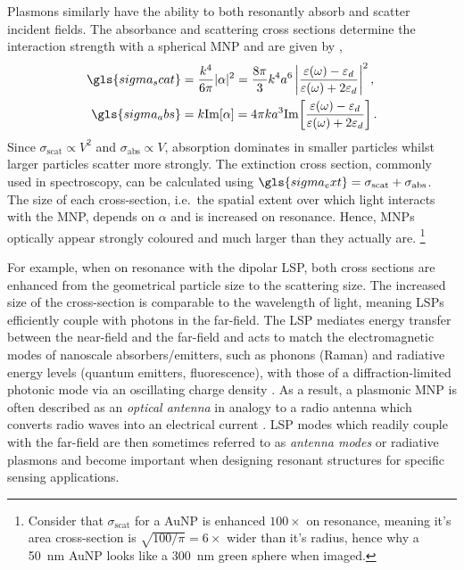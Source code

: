 \documentclass{article}
\begin{document}
Plasmons similarly have the ability to both resonantly absorb and scatter incident fields. The absorbance and scattering cross sections determine the interaction strength with a spherical MNP and are given by \cite{bohren2008absorption},
\begin{subequations}
\begin{align}
	\gls{sigma_scat} &= \frac{\wvm^4}{6\pi} |\alpha|^2 = \frac{8\pi}{3}\wvm^4a^6 \left| \frac{\dielectric - \epsdi}{\dielectric + 2\epsdi} \right|^2, \\
	\gls{sigma_abs} &= \wvm\imag{\alpha} = 4\pi \wvm a^3 \imag{ \frac{\dielectric - \epsdi}{\dielectric + 2\epsdi} }.
\end{align}
\end{subequations}
Since $\sigma_{\mathrm{scat}} \propto V^2$ and $\sigma_{\mathrm{abs}} \propto V$, absorption dominates in smaller particles whilst larger particles scatter more strongly. The extinction cross section, commonly used in spectroscopy, can be calculated using $\gls{sigma_ext}=\sigma_{\mathrm{scat}}+\sigma_{\mathrm{abs}}$. The size of each cross-section, i.e.\ the spatial extent over which light interacts with the MNP, depends on $\alpha$ and is increased on resonance. Hence, MNPs optically appear strongly coloured and much larger than they actually are.%
\footnote{Consider that $\sigma_{\mathrm{scat}}$ for a AuNP is enhanced $100\times$ on resonance, meaning it's area cross-section is $\sqrt{100/\pi}= 6\times$ wider than it's radius, hence why a \SI{50}{nm} AuNP looks like a \SI{300}{nm} green sphere when imaged.}

For example, when on resonance with the dipolar LSP, both cross sections are enhanced from the geometrical particle size to the  scattering size. The increased size of the cross-section is comparable to the wavelength of light, meaning LSPs efficiently couple with photons in the far-field. The LSP mediates energy transfer between the near-field and the far-field and acts to match the electromagnetic modes of nanoscale absorbers/emitters, such as phonons (Raman) and radiative energy levels (quantum emitters, fluorescence), with those of a diffraction-limited photonic mode via an oscillating charge density \cite{berweger2012}. As a result, a plasmonic MNP is often described as an \textit{optical antenna} in analogy to a radio antenna which converts radio waves into an electrical current \cite{bharadwaj2009, novotny2011}. LSP modes which readily couple with the far-field are then sometimes referred to as \emph{antenna modes} or radiative plasmons and become important when designing resonant structures for specific sensing applications.
\end{document}
